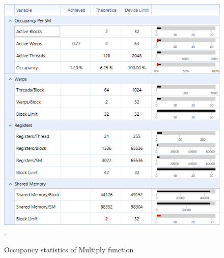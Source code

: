 \documentclass[oneside,openright,12pt,final,en]{mgr}
\begin{document}
\begin{figure}[H]
	\centering
	\includegraphics[width=\textwidth]{mull_occupancy}.
	\caption{Occupancy statistics of Multiply function}
	\label{fig:multiply_occupancy}
\end{figure}
\end{document}
